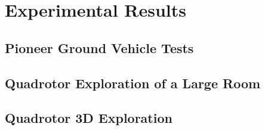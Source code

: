 
\chapter{Experimental Results}\label{chap:Experiments}


\section{Pioneer Ground Vehicle Tests}
\label{sec:PioneerNRL}

\section{Quadrotor Exploration of a Large Room}
\label{sec:QuadrotorNRL}

\section{Quadrotor 3D Exploration}
\label{sec:QuadrotorSEH}




